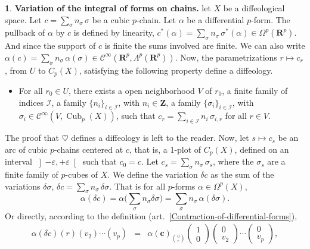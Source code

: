 \documentclass[11pt,reqno]{amsart}
\theoremstyle{definition}
\newtheorem{article}{}
\newcommand{\artlabel}[1]{{\bf #1.}}
\newcommand{\RR}{{\mathbf R}}
\newcommand{\ZZ}{{\mathbf Z}}
\newcommand{\cc}{{\mathbf c}}
\newcommand{\bmc}{\cc}
\def \U{{U}}
\def \V{{V}}
\def \X{{X}}
\newcommand{\cC}{{\mathcal C}}
\newcommand{\cI}{{\mathcal I}}
\newcommand{\art}[1]{{(art.~\ref{#1})}}
\newcommand{\Cub}{\operatorname{Cub}}
\newcommand{\DChains}[1]{C_{#1}}
\newcommand{\Cinf}{{\cC}^\infty}
\newcommand{\openinterval}[1]{\left] #1 \right[}
\begin{document}
  \begin{article}\artlabel{Variation of the integral of forms on chains} 
    \label{Variation-of-the-integral-of-a-form-on-chains}
    let $\X$ be a diffeological space. Let $c = \sum_\sigma
      n_\sigma \, \sigma$ be a cubic $p$-chain. Let $\alpha$ be
    a differential $p$-form. The pullback of $\alpha$ by $c$
    is defined by linearity, $c^*(\alpha) = \sum_\sigma
      n_\sigma \, \sigma^*(\alpha) \in \Omega^p(\RR^p)$. And
    since the support of $c$ is finite the sums involved are
    finite. We can also write $\alpha(c) = \sum_\sigma
      n_\sigma \, \alpha(\sigma) \in \Cinf(\RR^p,
      \Lambda^p(\RR^p))$. Now, the parametrizations $r
        \mapsto c_r$, from $\U$ to
    $\DChains{p}(\X)$, satisfying the following property
    define a diffeology.
    \begin{itemize}
      \item[$\heartsuit$] For all $r_0 \in \U$, there exists a
      open neighborhood $\V$ of $r_0$, a finite family of indices
      $\cI$, a family $\{n_i\}_{i \in \cI}$, with
      $n_i \in \ZZ$, a family $\{\sigma_i\}_{i \in
        \cI}$, with $\sigma_i \in
          \Cinf(\V,\Cub_p(\X))$, such that $c_r = \sum_{i \in
            \cI} n_i \, \sigma_{i,r}$ for all $r \in \V$.
    \end{itemize}
    The proof that $\heartsuit$ defines a diffeology is left
    to the reader. Now, let $s \mapsto c_s$ be an arc of
    cubic $p$-chains centered at $c$, that is, a 1-plot  of
    $\DChains{p}(\X)$, defined on an interval
    $\openinterval{-\varepsilon, +\varepsilon}$ such that
    $c_0 = c$. Let $c_s = \sum_\sigma n_\sigma \, \sigma_s$,
    where the $\sigma_s$ are a finite family of $p$-cubes of
    $\X$. We define the variation $\delta c$ as the sum of the
    variations $\delta \sigma$, $\delta c = \sum_\sigma
      n_\sigma \, \delta \sigma$. That is for all $p$-forms
    $\alpha \in \Omega^p(\X)$,
    $$
      \alpha(\delta c) = \alpha \bigg( \sum_\sigma n_\sigma
      \delta \sigma \bigg) = \sum_\sigma n_\sigma \,
      \alpha(\delta \sigma).
      $$
    Or directly, according to the definition
    \art{Contraction-of-differential-forms},
    \begin{eqnarray*}
      \alpha(\delta c)(r)(v_2) \cdots (v_{p})
      & = & \alpha(\bmc)_{0 \choose r}\begin{pmatrix}1 \\ 0\end{pmatrix}
      \begin{pmatrix}0 \\ v_2\end{pmatrix} \cdots \begin{pmatrix}0 \\ v_{p}\end{pmatrix}, \\

\end{eqnarray*}
\end{article}
\end{document}
